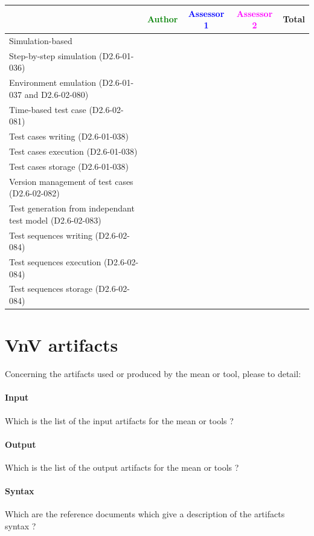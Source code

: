 \begin{tabular}{|l | c | c | c | c|}
\hline
& \textcolor{green}{Author} & \textcolor{blue}{Assessor 1} & \textcolor{magenta}{Assessor 2} & Total \\
\hline 
Simulation-based & & & &  \\
\hline
Step-by-step simulation (D2.6-01-036) & & & &  \\
\hline
Environment emulation (D2.6-01-037 and D2.6-02-080) & & & &  \\
\hline
Time-based test case (D2.6-02-081) & & & &  \\
\hline
Test cases writing (D2.6-01-038) & & & &  \\
\hline
Test cases execution (D2.6-01-038) & & & &  \\
\hline
Test cases storage (D2.6-01-038) & & & &  \\
\hline
Version management of test cases (D2.6-02-082) & & & &  \\
\hline
Test generation from independant test model (D2.6-02-083) & & & &  \\
\hline
Test sequences writing (D2.6-02-084) & & & &  \\
\hline
Test sequences execution (D2.6-02-084) & & & &  \\
\hline
Test sequences storage (D2.6-02-084) & & & &  \\
\hline
\end{tabular}

\section{VnV artifacts}


Concerning the artifacts used or produced by the mean or tool, please to detail:

\paragraph{Input}
    Which is the list of the input artifacts for the mean or tools ?
    
    
\paragraph{Output}
    Which is the list of the output artifacts for the mean or tools ?
    
\paragraph{Syntax}
    Which are the reference documents which give a description of the artifacts syntax  ?
    
